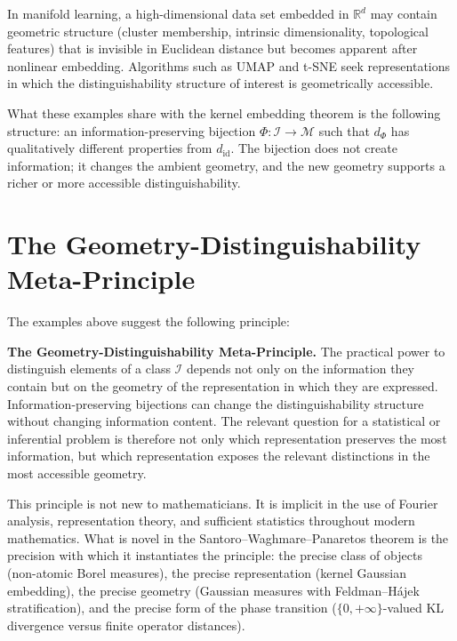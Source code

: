 \documentclass[12pt, oneside]{book}
\theoremstyle{plain}
\theoremstyle{definition}
\newcommand{\R}{\mathbb{R}}
\newcommand{\calM}{\mathcal{M}}
\newcommand{\calI}{\mathcal{I}}
\begin{document}
In manifold learning, a high-dimensional data set embedded in $\R^d$ may contain geometric structure (cluster membership, intrinsic dimensionality, topological features) that is invisible in Euclidean distance but becomes apparent after nonlinear embedding. Algorithms such as UMAP and t-SNE seek representations in which the distinguishability structure of interest is geometrically accessible.

What these examples share with the kernel embedding theorem is the following structure: an information-preserving bijection $\Phi: \calI \to \calM$ such that $d_\Phi$ has qualitatively different properties from $d_{\mathrm{id}}$. The bijection does not create information; it changes the ambient geometry, and the new geometry supports a richer or more accessible distinguishability.

\section{The Geometry-Distinguishability Meta-Principle}

The examples above suggest the following principle:

\begin{highlightbox}
\textbf{The Geometry-Distinguishability Meta-Principle.} The practical power to distinguish elements of a class $\calI$ depends not only on the information they contain but on the geometry of the representation in which they are expressed. Information-preserving bijections can change the distinguishability structure without changing information content. The relevant question for a statistical or inferential problem is therefore not only which representation preserves the most information, but which representation exposes the relevant distinctions in the most accessible geometry.
\end{highlightbox}

This principle is not new to mathematicians. It is implicit in the use of Fourier analysis, representation theory, and sufficient statistics throughout modern mathematics. What is novel in the Santoro--Waghmare--Panaretos theorem is the precision with which it instantiates the principle: the precise class of objects (non-atomic Borel measures), the precise representation (kernel Gaussian embedding), the precise geometry (Gaussian measures with Feldman--H\'ajek stratification), and the precise form of the phase transition ($\{0, +\infty\}$-valued KL divergence versus finite operator distances).
\end{document}

